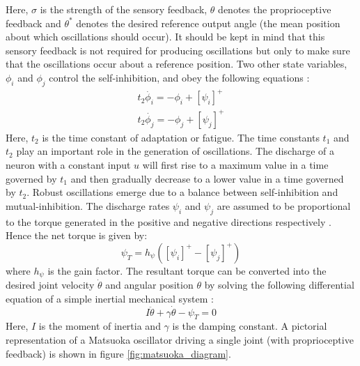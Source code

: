\documentclass[12pt,twoside]{article}
\theoremstyle{plain}
\theoremstyle{definition}
\theoremstyle{remark}
\begin{document}
Here, $\sigma$ is the strength of the sensory feedback, $\theta$ denotes the proprioceptive feedback and $\theta^{*}$ denotes the desired reference output angle (the mean position about which oscillations should occur). It should be kept in mind that this sensory feedback is not required for producing oscillations but only to make sure that the oscillations occur about a reference position. Two other state variables, $\phi_i$ and $\phi_j$ control the self-inhibition, and obey the following equations \cite{Ronsse2009}: 
\begin{subequations} 
\label{eq:matsuoka_phi}
\begin{align}
 t_2 \dot{\phi_i}=-\phi_i + [\psi_i]^+\\
 t_2 \dot{\phi_j}=-\phi_j + [\psi_j]^+
 \end{align}
\end{subequations}
Here, $t_2$ is the time constant of adaptation or fatigue. The time constants $t_1$ and $t_2$ play an important role in the generation of oscillations. The discharge of a neuron with a constant input $u$ will first rise to a maximum value in a time governed by $t_1$ and then gradually decrease to a lower value in a time governed by $t_2$. Robust oscillations emerge due to a balance between self-inhibition and mutual-inhibition. The discharge rates $\psi_i$ and $\psi_j$ are assumed to be proportional to the torque generated in the positive and negative directions respectively \cite{Ronsse2009}. Hence the net torque is given by: 
\begin{equation}
\label{eq:matsuoka_net_torque}
\psi_T=h_{\psi}([\psi_i]^+ - [\psi_j]^+)
\end{equation}
where $h_{\psi}$ is the gain factor. The resultant torque can be converted into the desired joint velocity $\dot{\theta}$ and angular position $\theta$ by solving the following differential equation of a simple inertial mechanical system \cite{Ronsse2009}:
\begin{equation}
\label{eq:inertial_system}
I\ddot{\theta} + \gamma \dot{\theta} - \psi_T = 0
\end{equation}
Here, $I$ is the moment of inertia and $\gamma$ is the damping constant. A pictorial representation of a Matsuoka oscillator driving a single joint (with proprioceptive feedback) is shown in figure \ref{fig:matsuoka_diagram}.
\end{document}
